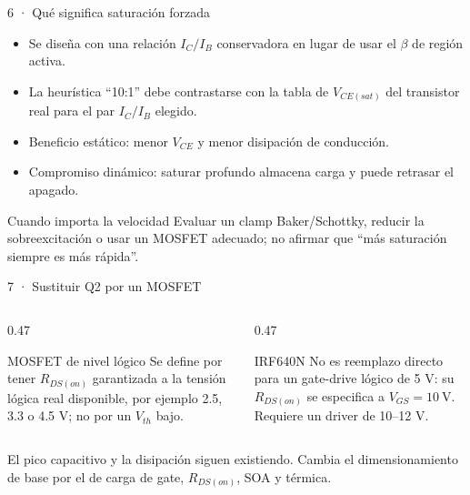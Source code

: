 \documentclass[aspectratio=169]{beamer}
\begin{document}
\begin{frame}{6 · Qué significa saturación forzada}
  \begin{itemize}
    \item Se diseña con una relación $I_C/I_B$ conservadora en lugar de usar el
      $\beta$ de región activa.
    \item La heurística ``10:1'' debe contrastarse con la tabla de
      $V_{CE(sat)}$ del transistor real para el par $I_C/I_B$ elegido.
    \item Beneficio estático: menor $V_{CE}$ y menor disipación de conducción.
    \item Compromiso dinámico: saturar profundo almacena carga y puede retrasar
      el apagado.
  \end{itemize}
  \begin{block}{Cuando importa la velocidad}
    Evaluar un clamp Baker/Schottky, reducir la sobreexcitación o usar un
    MOSFET adecuado; no afirmar que ``más saturación siempre es más rápida''.
  \end{block}
\end{frame}

\begin{frame}{7 · Sustituir Q2 por un MOSFET}
  \begin{columns}[T]
    \begin{column}{0.47\textwidth}
      \begin{block}{MOSFET de nivel lógico}
        Se define por tener $R_{DS(on)}$ garantizada a la tensión lógica real
        disponible, por ejemplo 2.5, 3.3 o 4.5 V; no por un $V_{th}$ bajo.
      \end{block}
    \end{column}
    \begin{column}{0.47\textwidth}
      \begin{alertblock}{IRF640N}
        No es reemplazo directo para un gate-drive lógico de 5 V: su $R_{DS(on)}$ se
        especifica a $V_{GS}=\SI{10}{\volt}$. Requiere un driver de 10--12 V.
      \end{alertblock}
    \end{column}
  \end{columns}
  \vfill
  El pico capacitivo y la disipación siguen existiendo. Cambia el
  dimensionamiento de base por el de carga de gate, $R_{DS(on)}$, SOA y térmica.
\end{frame}
\end{document}
